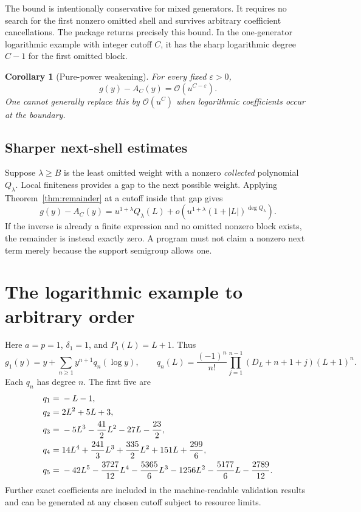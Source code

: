 \documentclass[11pt,a4paper]{article}
\numberwithin{equation}{section}
\newtheorem{corollary}[theorem]{Corollary}
\theoremstyle{definition}
\theoremstyle{remark}
\newcommand{\OO}{\mathcal O}
\begin{document}
The bound is intentionally conservative for mixed generators. It requires
no search for the first nonzero omitted shell and survives arbitrary
coefficient cancellations. The package returns precisely this bound.
In the one-generator logarithmic example with integer cutoff $C$, it has
the sharp logarithmic degree $C-1$ for the first omitted block.

\begin{corollary}[Pure-power weakening]
For every fixed $\varepsilon>0$,
\[
 g(y)-A_C(y)=\OO(u^{C-\varepsilon}).
\]
One cannot generally replace this by $\OO(u^C)$ when logarithmic
coefficients occur at the boundary.
\end{corollary}

\subsection{Sharper next-shell estimates}

Suppose $\lambda\ge B$ is the least omitted weight with a nonzero
\emph{collected} polynomial $Q_\lambda$. Local finiteness provides a gap
to the next possible weight. Applying Theorem~\ref{thm:remainder} at a
cutoff inside that gap gives
\[
 g(y)-A_C(y)
 =u^{1+\lambda}Q_\lambda(L)
 +o\!\left(u^{1+\lambda}(1+|L|)^{\deg Q_\lambda}\right).
\]
If the inverse is already a finite expression and no omitted nonzero
block exists, the remainder is instead exactly zero. A program must not
claim a nonzero next term merely because the support semigroup allows one.

\section{The logarithmic example to arbitrary order}
\label{sec:logexample}

Here $a=p=1$, $\delta_1=1$, and $P_1(L)=L+1$. Thus
\begin{equation}\label{eq:logcoeff}
 g_1(y)=y+\sum_{n\ge1}y^{n+1}q_n(\log y),\qquad
 q_n(L)=\frac{(-1)^n}{n!}
 \prod_{j=1}^{n-1}(D_L+n+1+j)(L+1)^n.
\end{equation}
Each $q_n$ has degree $n$. The first five are
\begin{align}
 q_1={}&-L-1,\notag\\
 q_2={}&2L^2+5L+3,\notag\\
 q_3={}&-5L^3-\frac{41}{2}L^2-27L-\frac{23}{2},\notag\\
 q_4={}&14L^4+\frac{241}{3}L^3+\frac{335}{2}L^2+151L+\frac{299}{6},
 \label{eq:logcoefftable}\\
 q_5={}&-42L^5-\frac{3727}{12}L^4-\frac{5365}{6}L^3
 -1256L^2-\frac{5177}{6}L-\frac{2789}{12}.\notag
\end{align}
Further exact coefficients are included in the machine-readable validation
results and can be generated at any chosen cutoff subject to resource
limits.
\end{document}
